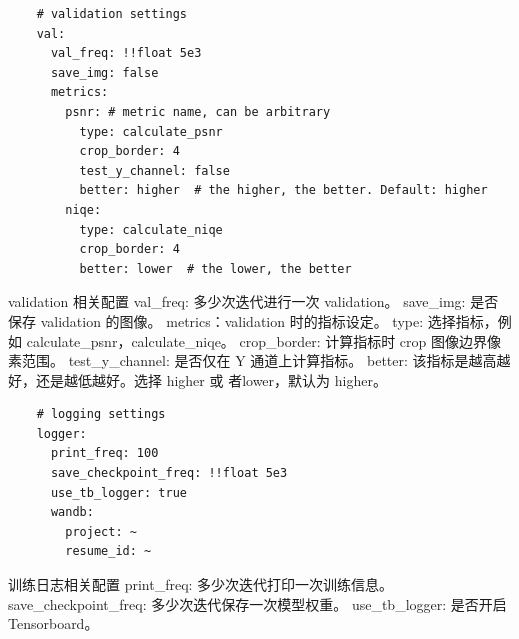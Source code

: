 \documentclass[../main.tex]{subfiles}
\begin{document}
    \begin{verbatim}
    # validation settings
    val:
      val_freq: !!float 5e3
      save_img: false
      metrics:
        psnr: # metric name, can be arbitrary
          type: calculate_psnr
          crop_border: 4
          test_y_channel: false
          better: higher  # the higher, the better. Default: higher
        niqe:
          type: calculate_niqe
          crop_border: 4
          better: lower  # the lower, the better
    \end{verbatim}
    \begin{exampleBox}[righthand ratio=0.00, sidebyside, sidebyside align=center, lower separated=false]{validation 相关配置}
    val\_freq: 多少次迭代进行一次 validation。
    save\_img: 是否保存 validation 的图像。
    metrics：validation 时的指标设定。
    type: 选择指标，例如 calculate\_psnr，calculate\_niqe。
    crop\_border: 计算指标时 crop 图像边界像素范围。
    test\_y\_channel: 是否仅在 Y 通道上计算指标。
    better: 该指标是越高越好，还是越低越好。选择 higher 或 者lower，默认为 higher。
    \end{exampleBox}
    \begin{verbatim}
    # logging settings
    logger:
      print_freq: 100
      save_checkpoint_freq: !!float 5e3
      use_tb_logger: true
      wandb:
        project: ~
        resume_id: ~
    \end{verbatim}
    \begin{exampleBox}[righthand ratio=0.00, sidebyside, sidebyside align=center, lower separated=false]{训练日志相关配置}
    print\_freq: 多少次迭代打印一次训练信息。
    save\_checkpoint\_freq: 多少次迭代保存一次模型权重。
    use\_tb\_logger: 是否开启 Tensorboard。
    \end{exampleBox}
\end{document}
